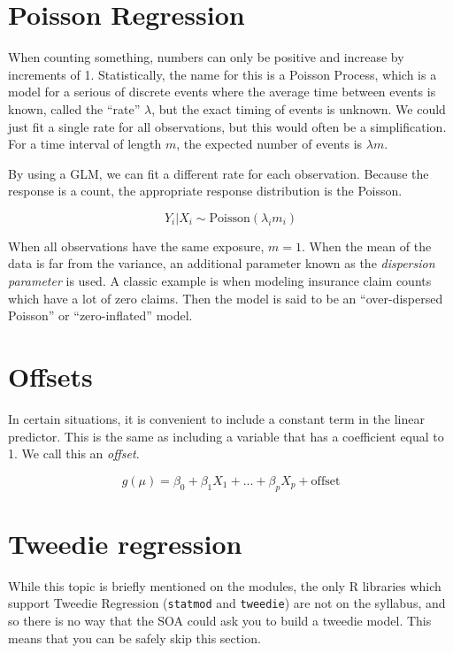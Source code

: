 \documentclass[openany]{book}
\begin{document}
\hypertarget{poisson-regression}{%
\section{Poisson Regression}\label{poisson-regression}}

When counting something, numbers can only be positive and increase by increments of 1. Statistically, the name for this is a Poisson Process, which is a model for a serious of discrete events where the average time between events is known, called the ``rate'' \(\lambda\), but the exact timing of events is unknown. We could just fit a single rate for all observations, but this would often be a simplification. For a time interval of length \(m\), the expected number of events is \(\lambda m\).

By using a GLM, we can fit a different rate for each observation. Because the response is a count, the appropriate response distribution is the Poisson.

\[Y_i|X_i \sim \text{Poisson}(\lambda_i m_i)\]

When all observations have the same exposure, \(m = 1\). When the mean of the data is far from the variance, an additional parameter known as the \emph{dispersion parameter} is used. A classic example is when modeling insurance claim counts which have a lot of zero claims. Then the model is said to be an ``over-dispersed Poisson'' or ``zero-inflated'' model.

\hypertarget{offsets}{%
\section{Offsets}\label{offsets}}

In certain situations, it is convenient to include a constant term in the linear predictor. This is the same as including a variable that has a coefficient equal to 1. We call this an \emph{offset}.

\[g(\mu) = \beta_0 + \beta_1 X_1 + ... + \beta_p X_p + \text{offset}\]

\hypertarget{tweedie-regression}{%
\section{Tweedie regression}\label{tweedie-regression}}

While this topic is briefly mentioned on the modules, the only R libraries which support Tweedie Regression (\texttt{statmod} and \texttt{tweedie}) are not on the syllabus, and so there is no way that the SOA could ask you to build a tweedie model. This means that you can be safely skip this section.
\end{document}
